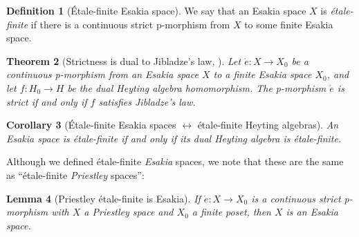 \documentclass[12pt]{amsart}
\theoremstyle{plain}
\newtheorem{theorem}{Theorem}[section]
\newtheorem{lemma}[theorem]{Lemma}
\newtheorem{corollary}[theorem]{Corollary}
\theoremstyle{definition}
\newtheorem{definition}[theorem]{Definition}
\begin{document}
\begin{definition}[\'Etale-finite Esakia space]
    We say that an Esakia space $X$ is \emph{étale-finite} if there is a continuous strict p-morphism from $X$ to some finite Esakia space.
\end{definition}

\begin{theorem}[Strictness is dual to Jibladze's law, {\cite[Cor.~4.7]{kuznetsovetale}}] \label{t:strict-dual-to-Jib}
    Let $\acute{e} \colon X \to X_0$ be a continuous p-morphism from an Esakia space $X$ to a finite Esakia space $X_0$, and let $f \colon H_0 \to H$ be the dual Heyting algebra homomorphism.
    The p-morphism $\acute{e}$ is strict if and only if $f$ satisfies Jibladze's law. 
\end{theorem}

\begin{corollary}[\'Etale-finite Esakia spaces $\leftrightarrow$ étale-finite Heyting algebras] \label{cor:etale-finite-iff-etale-finite}
    An Esakia space is étale-finite if and only if its dual Heyting algebra is étale-finite.
\end{corollary}

Although we defined étale-finite \emph{Esakia} spaces, we note that these are the same as ``étale-finite \emph{Priestley} spaces'':


\begin{lemma}[Priestley étale-finite is Esakia]\label{lem: priestley etale-finite is esakia}
    If $\acute{e}\colon X\to X_{0}$ is a continuous strict p-morphism with $X$ a Priestley space and $X_{0}$ a finite poset, then $X$ is an Esakia space.
\end{lemma}
\end{document}
